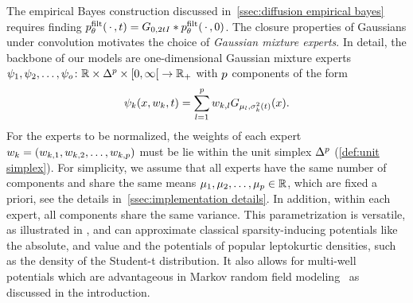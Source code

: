 The empirical Bayes construction discussed in~\cref{ssec:diffusion empirical bayes} requires finding \( p^{\mathrm{filt}}_\theta(\,\cdot\,, t) =  G_{\num{0},\num{2}tI} * p^{\mathrm{filt}}_\theta(\,\cdot\,, \num{0}) \).
The closure properties of Gaussians under convolution motivates the choice of \emph{Gaussian mixture experts}.
In detail, the backbone of our models are one-dimensional Gaussian mixture experts~\( \map{\Expert_{\num{1}}, \Expert_{\num{2}}, \dotsc, \Expert_\NumExperts}{\R \times \Simplex^\NumComponents \times \rinterval{\num{0}}{\infty}}{\R_+} \) with \( p \) components of the form
\begin{equation}
	\psi_k(x, w_k, t) = \sum_{l=\num{1}}^{p} w_{k,l} G_{\mu_l,\sigma_k^{\num{2}}(t)}(x).
	\label{eq:expert}
\end{equation}
For the experts to be normalized, the weights of each expert \( w_k = (w_{k,\num{1}}, w_{k, \num{2}}, \dotsc,\allowbreak w_{k, p}) \) must be lie within the unit simplex \( \Delta^p \) (\cref{def:unit simplex}).
For simplicity, we assume that all experts have the same number of components and share the same means \( \mu_{\num{1}}, \mu_{\num{2}}, \dotsc, \mu_p \in \mathbb{R} \), which are fixed a priori, see the details in~\cref{ssec:implementation details}.
In addition, within each expert, all components share the same variance.
This parametrization is versatile, as illustrated in , and can  approximate classical sparsity-inducing potentials like the absolute, and value and the potentials of popular leptokurtic densities, such as the density of the Student-t distribution.
It also allows for multi-well potentials which are advantageous in Markov random field modeling~\cite{heess_learning_2009,zhu_minimax_1997} as discussed in the introduction.

